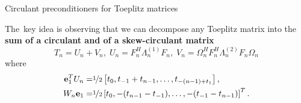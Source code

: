 \documentclass[aspectratio=169,xcolor=dvipsnames]{beamer}
\begin{document}
\begin{frame}{Circulant preconditioners for Toeplitz matrices}

The \alert{\faKey\,key idea} is observing that we can decompose any Toeplitz matrix into the \textbf{sum of a circulant and of a skew-circulant matrix}
\begin{equation*}
	T_n = U_n + V_n, \; U_n = F_n^H \Lambda_n^{(1)} F_n, \; V_n = \Omega_n^H F_n^H \Lambda_n^{(2)} F_n \Omega_n
\end{equation*}
where
\begin{equation*}
	\begin{split}
		\mathbf{e}_1^T U_n = & \nicefrac{1}{2}\left[
		t_0 , t_{-1} + t_{n-1} , \ldots , t_{-(n-1)+t_1}
		\right],\\
		W_n\mathbf{e}_1 = & \nicefrac{1}{2}\left[
		t_0 , -(t_{n-1}-t_{-1}) , \ldots , -(t_{-1}-t_{n-1})
		\right]^T.
	\end{split}
\end{equation*}

\end{frame}
\end{document}
